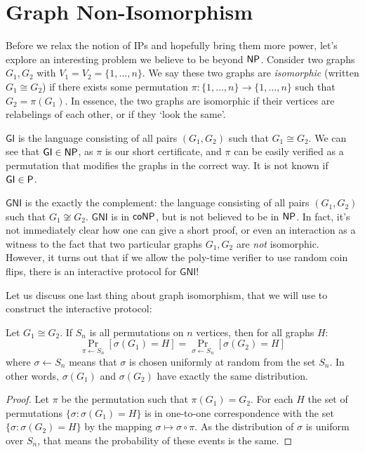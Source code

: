 \documentclass{article}
\begin{document}
\section{Graph Non-Isomorphism}

Before we relax the notion of IPs and hopefully bring them more power, let's explore an interesting problem we believe to be beyond $\mathsf{NP}$.
Consider two graphs $G_1, G_2$ with $V_1 = V_2 = \{1, \ldots, n \}$.
We say these two graphs are \textit{isomorphic} (written $G_1 \cong G_2$) if there exists some permutation $\pi \colon \{1, \ldots, n \} \to \{1, \ldots, n\}$ such that $G_2 = \pi(G_1)$. 
In essence, the two graphs are isomorphic if their vertices are relabelings of each other, or if they `look the same'.

$\textsf{GI}$ is the language consisting of all pairs $(G_1, G_2)$ such that 
$G_1 \cong G_2$. We can see that $\textsf{GI} \in \mathsf{NP}$, as $\pi$ is our short certificate, and $\pi$ can be easily verified as a permutation that modifies the graphs in the correct way. It is not known if $\textsf{GI} \in \mathsf{P}$.

$\textsf{GNI}$ is the exactly the complement: the language consisting of all pairs $(G_1, G_2)$ such that $G_1 \not\cong G_2$. 
$\textsf{GNI}$ is in $\mathsf{coNP}$, but is not believed to be in $\mathsf{NP}$. 
In fact, it's not immediately clear how one can give a short proof, or even an interaction as a witness to the fact that two particular graphs $G_1, G_2$ are \textit{not} isomorphic. 
However, it turns out that if we allow the poly-time verifier to use random coin flips, there is an interactive protocol for $\textsf{GNI}$!

Let us discuss one last thing about graph isomorphism, that we will use to construct the interactive protocol:

\begin{claim} \label{claim:iso_dist}
    Let $G_1 \cong G_2$. If $S_n$ is all permutations on $n$ vertices, then for all graphs $H$:
    $$\Pr_{\pi \leftarrow S_n}[\sigma(G_1) = H] = \Pr_{\sigma \leftarrow S_n}[\sigma(G_2) = H]$$
    where $\sigma \leftarrow S_n$ means that $\sigma$ is chosen uniformly at random from the set $S_n$. In other words, $\sigma(G_1)$ and $\sigma(G_2)$ have exactly the same distribution.
\end{claim}
\begin{proof}
    Let $\pi$ be the permutation such that $\pi(G_1) = G_2$.
    For each $H$ the set of permutations $\{ \sigma \colon \sigma(G_1) = H\}$ is in one-to-one correspondence with the set $\{ \sigma \colon \sigma(G_2) = H \}$ by the mapping $\sigma \mapsto \sigma \circ \pi$.
    As the distribution of $\sigma$ is uniform over $S_n$, that means the probability of these events is the same.
\end{proof}
\end{document}
